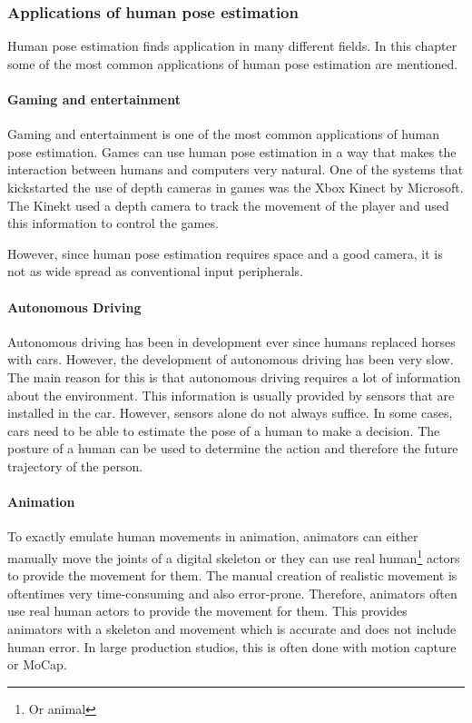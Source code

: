 \subsubsection{Applications of human pose estimation}
Human pose estimation finds application in many different fields. In this chapter some of the most common applications of human pose estimation are mentioned.

\paragraph{Gaming and entertainment}

Gaming and entertainment is one of the most common applications of human pose estimation. Games can use human pose estimation in a way that makes the interaction between humans and computers very natural. One of the systems that kickstarted the use of depth cameras in games was the Xbox Kinect by Microsoft. The Kinekt used a depth camera to track the movement of the player and used this information to control the games.

However, since human pose estimation requires space and a good camera, it is not as wide spread as conventional input peripherals.

\paragraph{Autonomous Driving}

Autonomous driving has been in development ever since humans replaced horses with cars\cite{OldAutoDrive}. However, the development of autonomous driving has been very slow. The main reason for this is that autonomous driving requires a lot of information about the environment. This information is usually provided by sensors that are installed in the car. However, sensors alone do not always suffice. In some cases, cars need to be able to estimate the pose of a human to make a decision. The posture of a human can be used to determine the action and therefore the future trajectory of the person. 

\paragraph{Animation}

To exactly emulate human movements in animation, animators can either manually move the joints of a digital skeleton or they can use real human\footnote{Or animal} actors to provide the movement for them. The manual creation of realistic movement is oftentimes very time-consuming and also error-prone. Therefore, animators often use real human actors to provide the movement for them. This provides animators with a skeleton and movement which is accurate and does not include human error. In large production studios, this is often done with motion capture or MoCap. 

